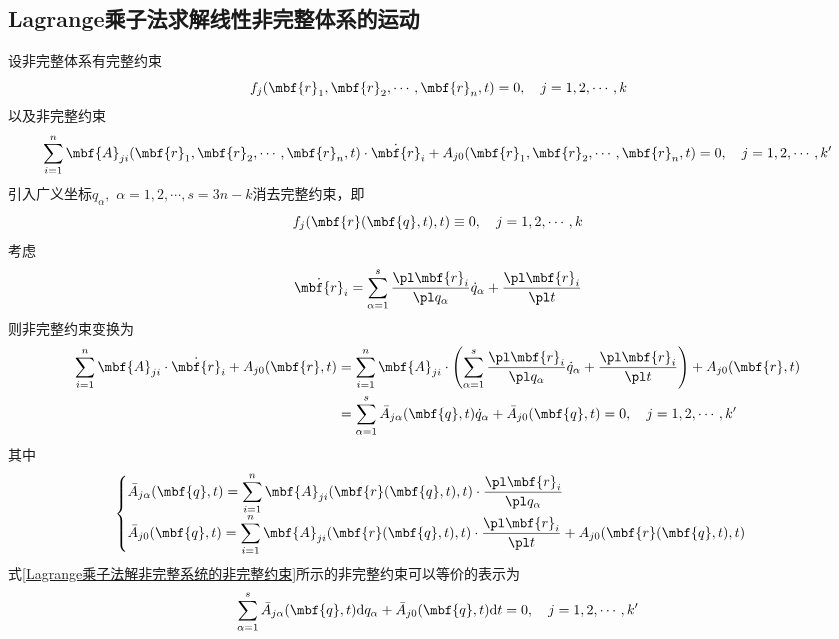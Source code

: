 \subsection{Lagrange乘子法求解线性非完整体系的运动}

设非完整体系有完整约束
\begin{equation*}
	f_j (\mbf{r}_1,\mbf{r}_2,\cdots,\mbf{r}_n,t) = 0,\quad j = 1,2,\cdots,k
\end{equation*}
以及非完整约束
\begin{equation*}
	\sum_{i=1}^n \mbf{A}_{ji}(\mbf{r}_1,\mbf{r}_2,\cdots,\mbf{r}_n,t) \cdot \dot{\mbf{r}}_i + A_{j0}(\mbf{r}_1,\mbf{r}_2,\cdots,\mbf{r}_n,t) = 0,\quad j = 1,2,\cdots,k'
\end{equation*}
引入广义坐标$q_\alpha,\,\,\alpha = 1,2,\cdots,s=3n-k$消去完整约束，即
\begin{equation*}
	f_j(\mbf{r}(\mbf{q},t),t) \equiv 0,\quad j=1,2,\cdots,k
\end{equation*}
考虑
\begin{equation*}
	\dot{\mbf{r}}_i = \sum_{\alpha=1}^s \frac{\pl \mbf{r}_i}{\pl q_\alpha} \dot{q}_\alpha + \frac{\pl \mbf{r}_i}{\pl t}
\end{equation*}
则非完整约束变换为
\begin{align}
	\sum_{i=1}^n \mbf{A}_{ji} \cdot \dot{\mbf{r}}_i + A_{j0}(\mbf{r},t) & = \sum_{i=1}^n \mbf{A}_{ji} \cdot \left(\sum_{\alpha=1}^s \frac{\pl \mbf{r}_i}{\pl q_\alpha} \dot{q}_\alpha + \frac{\pl \mbf{r}_i}{\pl t}\right) + A_{j0}(\mbf{r},t) \nonumber \\
	& = \sum_{\alpha=1}^s \bar{A}_{j\alpha}(\mbf{q},t) \dot{q}_\alpha + \bar{A}_{j0}(\mbf{q},t) = 0,\quad j=1,2,\cdots,k'
	\label{Lagrange乘子法解非完整系统的非完整约束}
\end{align}
其中
\begin{equation*}
	\begin{cases}
		\displaystyle \bar{A}_{j\alpha}(\mbf{q},t) = \sum_{i=1}^n \mbf{A}_{ji}(\mbf{r}(\mbf{q},t),t) \cdot \frac{\pl \mbf{r}_i}{\pl q_\alpha} \\[1.5ex]
		\displaystyle \bar{A}_{j0}(\mbf{q},t) = \sum_{i=1}^n \mbf{A}_{ji}(\mbf{r}(\mbf{q},t),t) \cdot \frac{\pl \mbf{r}_i}{\pl t} + A_{j0}(\mbf{r}(\mbf{q},t),t)
	\end{cases}
\end{equation*}
式\eqref{Lagrange乘子法解非完整系统的非完整约束}所示的非完整约束可以等价的表示为
\begin{align}
	\sum_{\alpha=1}^s \bar{A}_{j\alpha}(\mbf{q},t) \mathrm{d} q_\alpha + \bar{A}_{j0}(\mbf{q},t) \mathrm{d} t = 0,\quad j=1,2,\cdots,k'
\end{align}
